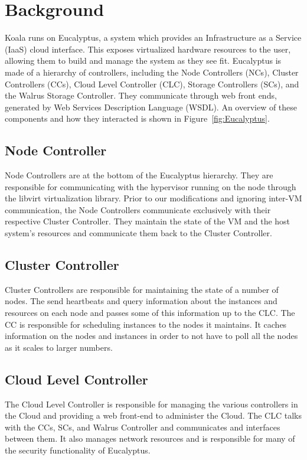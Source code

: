 \section{Background}
\label{sec:background}

Koala runs on Eucalyptus, a system which provides an Infrastructure as a
Service (IaaS) cloud interface.  This exposes virtualized hardware resources to
the user, allowing them to build and manage the system as they see fit.
Eucalyptus is made of a hierarchy of controllers, including the Node
Controllers (NCs), Cluster Controllers (CCs), Cloud Level Controller (CLC),
Storage Controllers (SCs), and the Walrus Storage Controller.  They communicate
through web front ends, generated by Web Services Description Language (WSDL).
An overview of these components and how they interacted is shown in
Figure~\ref{fig:Eucalyptus}.


\subsection{Node Controller}
Node Controllers are at the bottom of the Eucalyptus hierarchy.  They are responsible for communicating with the hypervisor running on the node through the libvirt virtualization library.  Prior to our modifications and ignoring inter-VM communication, the Node Controllers communicate exclusively with their respective Cluster Controller.  They maintain the state of the VM and the host system's resources and communicate them back to the Cluster Controller.

\subsection{Cluster Controller}
Cluster Controllers are responsible for maintaining the state of a number of nodes.  The send heartbeats and query information about the instances and resources on each node and passes some of this information up to the CLC.  The CC is responsible for scheduling instances to the nodes it maintains.  It caches information on the nodes and instances in order to not have to poll all the nodes as it scales to larger numbers.

\subsection{Cloud Level Controller}
The Cloud Level Controller is responsible for managing the various controllers in the Cloud and providing a web front-end to administer the Cloud.  The CLC talks with the CCs, SCs, and Walrus Controller and communicates and interfaces between them.  It also manages network resources and is responsible for many of the security functionality of Eucalyptus.

